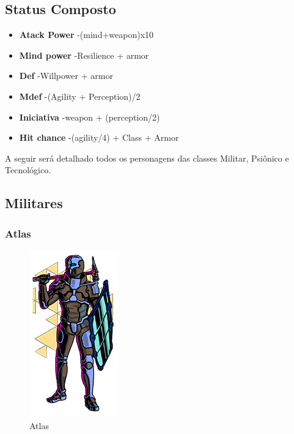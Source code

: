 \documentclass[11pt]{article} %
\begin{document}
\subsection{Status Composto}

\begin {itemize}
  \item \textbf{Atack Power} -(mind+weapon)x10 
  \item \textbf{Mind power} -Resilience + armor 
  \item \textbf{Def} -Willpower + armor 
  \item \textbf{Mdef} -(Agility + Perception)/2 
  \item \textbf{Iniciativa} -weapon + (perception/2) 
  \item \textbf{Hit chance} -(agility/4) + Class + Armor 
\end {itemize}

A seguir será detalhado todos os personagens das classes Militar, Psiônico e Tecnológico.

\subsection{Militares}

\subsubsection{Atlas}

\begin{figure}[!htp]
\centering
\includegraphics[scale=0.5]{res/characters/Atlas.png}
\caption{Atlas}
\label{Atlas}
\end{figure}
\end{document}

